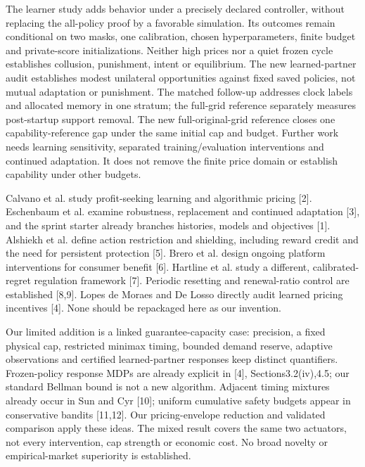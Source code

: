 \documentclass[a4paper,10pt]{article}
\newcommand{\reportheading}[1]{\par\vspace{5pt}{\large\bfseries\color{ink}#1}\par\vspace{2pt}}
\begin{document}
The learner study adds behavior under a precisely declared controller, without replacing the all-policy proof by a favorable simulation. Its outcomes remain conditional on two masks, one calibration, chosen hyperparameters, finite budget and private-score initializations. Neither high prices nor a quiet frozen cycle establishes collusion, punishment, intent or equilibrium. The new learned-partner audit establishes modest unilateral opportunities against fixed saved policies, not mutual adaptation or punishment. The matched follow-up addresses clock labels and allocated memory in one stratum; the full-grid reference separately measures post-startup support removal. The new full-original-grid reference closes one capability-reference gap under the same initial cap and budget. Further work needs learning sensitivity, separated training/evaluation interventions and continued adaptation. It does not remove the finite price domain or establish capability under other budgets.
\par

\reportheading{Relation to prior work and the sprint starter}

Calvano et al. study profit-seeking learning and algorithmic pricing [2]. Eschenbaum et al. examine robustness, replacement and continued adaptation [3], and the sprint starter already branches histories, models and objectives [1]. Alshiekh et al. define action restriction and shielding, including reward credit and the need for persistent protection [5]. Brero et al. design ongoing platform interventions for consumer benefit [6]. Hartline et al. study a different, calibrated-regret regulation framework [7]. Periodic resetting and renewal-ratio control are established [8,9]. Lopes de Moraes and De Losso directly audit learned pricing incentives [4]. None should be repackaged here as our invention.
\par

Our limited addition is a linked guarantee-capacity case: precision, a fixed physical cap, restricted minimax timing, bounded demand reserve, adaptive observations and certified learned-partner responses keep distinct quantifiers. Frozen-policy response MDPs are already explicit in [4], Sections3.2(iv),4.5; our standard Bellman bound is not a new algorithm. Adjacent timing mixtures already occur in Sun and Cyr [10]; uniform cumulative safety budgets appear in conservative bandits [11,12]. Our pricing-envelope reduction and validated comparison apply these ideas. The mixed result covers the same two actuators, not every intervention, cap strength or economic cost. No broad novelty or empirical-market superiority is established.
\par
\end{document}
